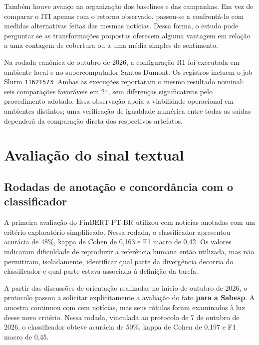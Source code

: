 Também houve avanço na organização dos baselines e das campanhas. Em vez de comparar o ITI apenas com o retorno observado, passou-se a confrontá-lo com medidas alternativas feitas das mesmas notícias. Dessa forma, o estudo pode perguntar se as transformações propostas oferecem alguma vantagem em relação a uma contagem de cobertura ou a uma média simples de sentimento.

Na rodada canônica de outubro de 2026, a configuração R1 foi executada em ambiente local e no supercomputador Santos Dumont. Os registros incluem o job Slurm \texttt{11621573}. Ambas as execuções reportaram o mesmo resultado nominal: seis comparações favoráveis em 24, sem diferenças significativas pelo procedimento adotado. Essa observação apoia a viabilidade operacional em ambientes distintos; uma verificação de igualdade numérica entre todas as saídas dependerá da comparação direta dos respectivos artefatos.
\fi

\section{Avaliação do sinal textual}

\subsection{Rodadas de anotação e concordância com o classificador}

A primeira avaliação do FinBERT-PT-BR utilizou cem notícias anotadas com um critério exploratório simplificado. Nessa rodada, o classificador apresentou acurácia de 48\%, kappa de Cohen de 0,163 e F1 macro de 0,42. Os valores indicaram dificuldade de reproduzir a referência humana então utilizada, mas não permitiram, isoladamente, identificar qual parte da divergência decorria do classificador e qual parte estava associada à definição da tarefa.

A partir das discussões de orientação realizadas no início de outubro de 2026, o protocolo passou a solicitar explicitamente a avaliação do fato \textbf{para a Sabesp}. A amostra continuou com cem notícias, mas seus rótulos foram examinados à luz desse novo critério. Nessa rodada, vinculada ao protocolo de 7 de outubro de 2026, o classificador obteve acurácia de 50\%, kappa de Cohen de 0,197 e F1 macro de 0,45.

